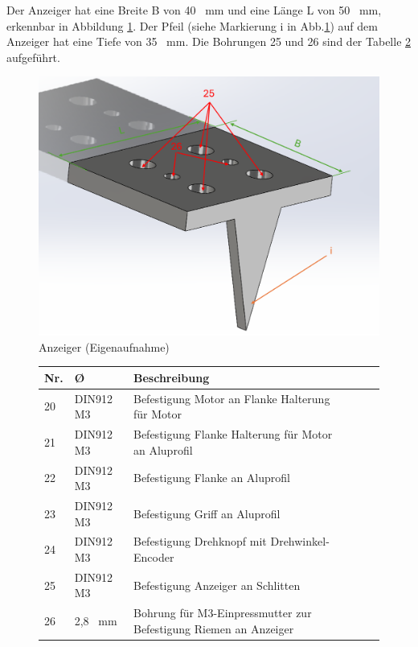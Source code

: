 Der Anzeiger hat eine Breite B von 40 \ mm und eine Länge L von 50 \ mm, erkennbar in Abbildung \ref{AnzeigerK}. Der Pfeil (siehe Markierung i in Abb.\ref{AnzeigerK}) auf dem Anzeiger hat eine Tiefe von 35 \ mm. Die Bohrungen 25 und 26 sind der Tabelle \ref{BohrungenAK} aufgeführt.

\begin{figure}[H]
	\begin{center}
		\includegraphics[width=\textwidth]{Images/Konstruktion/AnzeigerK.png}
		\caption{Anzeiger (Eigenaufnahme)} \label{AnzeigerK}
	\end{center}
\end{figure}  
 
 \begin{figure}[H]
 	\begin{center}
 		\fontsize{8}{10}\selectfont
 		\begin{tabularx}{\textwidth}{|p{0.4cm}|p{1.2cm}|X|X|X|X|} 
 			\hline 
 			\textbf{Nr.} & \textbf{\O} & \textbf{Beschreibung} \\ \hline
 			20 & DIN912 M3 & Befestigung Motor an Flanke Halterung für Motor \\ \hline
 			21 & DIN912 M3 & Befestigung Flanke Halterung für Motor an Aluprofil \\ \hline
 			22 & DIN912 M3 & Befestigung Flanke an Aluprofil  \\ \hline
 			23 & DIN912 M3 & Befestigung Griff an Aluprofil \\ \hline
 			24 & DIN912 M3 & Befestigung Drehknopf mit Drehwinkel-Encoder \\ \hline
 			25 & DIN912 M3 & Befestigung Anzeiger an Schlitten \\ \hline
 			26 & 2,8 \ mm & Bohrung für M3-Einpressmutter zur Befestigung Riemen an Anzeiger \\ \hline
 		\end{tabularx}
 			\label{BohrungenAK}
 	\end{center}
 \end{figure}


